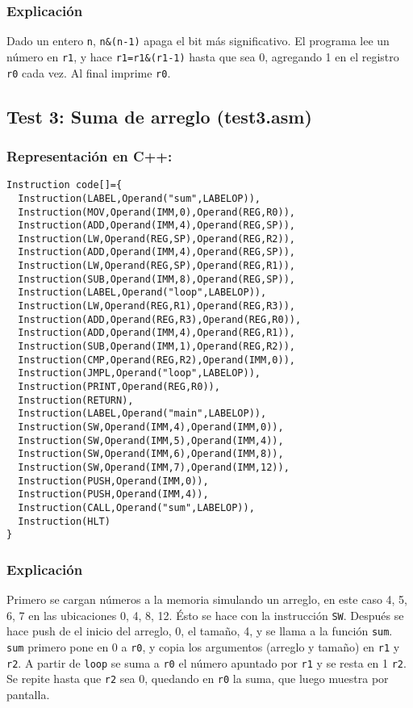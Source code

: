 \documentclass[12pt]{article}
\begin{document}
\subsubsection*{Explicación}
Dado un entero \verb+n+, \verb+n&(n-1)+ apaga el bit más significativo. El programa lee un número en \verb+r1+, y hace \verb+r1=r1&(r1-1)+ hasta que sea 0, agregando 1 en el registro \verb+r0+ cada vez. Al final imprime \verb+r0+.
\subsection*{Test 3: Suma de arreglo (test3.asm)}
\subsubsection*{Representación en C++:}
\begin{verbatim}
Instruction code[]={
  Instruction(LABEL,Operand("sum",LABELOP)),
  Instruction(MOV,Operand(IMM,0),Operand(REG,R0)),
  Instruction(ADD,Operand(IMM,4),Operand(REG,SP)),
  Instruction(LW,Operand(REG,SP),Operand(REG,R2)),
  Instruction(ADD,Operand(IMM,4),Operand(REG,SP)),
  Instruction(LW,Operand(REG,SP),Operand(REG,R1)),
  Instruction(SUB,Operand(IMM,8),Operand(REG,SP)),
  Instruction(LABEL,Operand("loop",LABELOP)),
  Instruction(LW,Operand(REG,R1),Operand(REG,R3)),
  Instruction(ADD,Operand(REG,R3),Operand(REG,R0)),
  Instruction(ADD,Operand(IMM,4),Operand(REG,R1)),
  Instruction(SUB,Operand(IMM,1),Operand(REG,R2)),
  Instruction(CMP,Operand(REG,R2),Operand(IMM,0)),
  Instruction(JMPL,Operand("loop",LABELOP)),
  Instruction(PRINT,Operand(REG,R0)),
  Instruction(RETURN),
  Instruction(LABEL,Operand("main",LABELOP)),
  Instruction(SW,Operand(IMM,4),Operand(IMM,0)),
  Instruction(SW,Operand(IMM,5),Operand(IMM,4)),
  Instruction(SW,Operand(IMM,6),Operand(IMM,8)),
  Instruction(SW,Operand(IMM,7),Operand(IMM,12)),
  Instruction(PUSH,Operand(IMM,0)),
  Instruction(PUSH,Operand(IMM,4)),
  Instruction(CALL,Operand("sum",LABELOP)),
  Instruction(HLT)
}
\end{verbatim}
\subsubsection*{Explicación}
Primero se cargan números a la memoria simulando un arreglo, en este caso 4, 5, 6, 7 en las ubicaciones 0, 4, 8, 12. Ésto se hace con la instrucción \verb+SW+. Después se hace push de el inicio del arreglo, 0, el tamaño, 4, y se llama a la función \verb+sum+. \verb+sum+ primero pone en 0 a \verb+r0+, y copia los argumentos (arreglo y tamaño) en \verb+r1+ y \verb+r2+. A partir de \verb+loop+ se suma a \verb+r0+ el número apuntado por \verb+r1+ y se resta en 1 \verb+r2+. Se repite hasta que \verb+r2+ sea 0, quedando en \verb+r0+ la suma, que luego muestra por pantalla.
\end{document}

